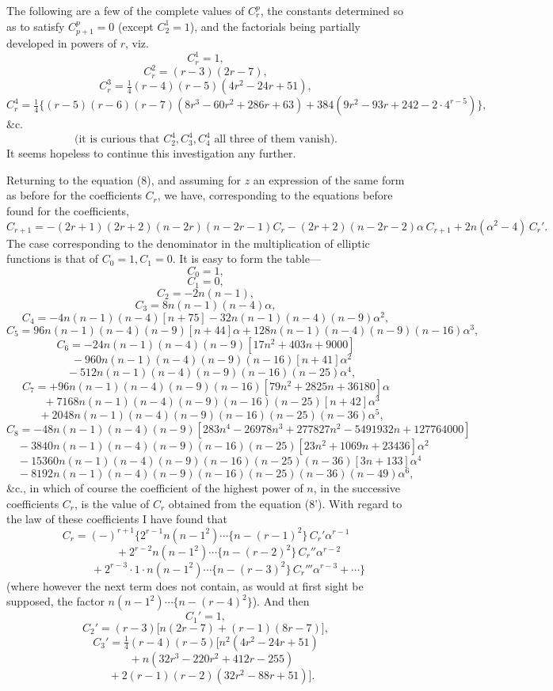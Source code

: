 \documentclass[12pt,a4paper]{article}
\begin{document}
The following are a few of the complete values of $C_r^p$, the constants determined so as to satisfy $C_{p+1}^p = 0$ (except $C_2^1 = 1$), and the factorials being partially developed in powers of $r$, viz.
\[
C_r^1 = 1,
\]
\[
C_r^2 = (r - 3)(2r - 7),
\]
\[
C_r^3 = \tfrac14(r - 4)(r - 5)(4r^2 - 24r + 51),
\]
\[
C_r^4 = \tfrac14\bigl\{(r - 5)(r - 6)(r - 7)(8r^3 - 60r^2 + 286r + 63) + 384(9r^2 - 93r + 242 - 2\cdot 4^{r-5})\bigr\},
\]
\&c.\
\[
\text{(it is curious that }C_2^4, C_3^4, C_4^4\text{ all three of them vanish).}
\]
It seems hopeless to continue this investigation any further.

Returning to the equation (8), and assuming for $z$ an expression of the same form as before for the coefficients $C_r$, we have, corresponding to the equations before found for the coefficients,
\[
C_{r+1} = -(2r + 1)(2r + 2)(n - 2r)(n - 2r - 1)C_r - (2r + 2)(n - 2r - 2)\alpha\,C_{r+1} + 2n(\alpha^2 - 4)\,C_r'.
\]
The case corresponding to the denominator in the multiplication of elliptic functions is that of $C_0 = 1, C_1 = 0$. It is easy to form the table---
\[
C_0 = 1,
\]
\[
C_1 = 0,
\]
\[
C_2 = -2n(n - 1),
\]
\[
C_3 = 8n(n - 1)(n - 4)\alpha,
\]
\[
C_4 = -4n(n - 1)(n - 4)[n + 75] - 32n(n - 1)(n - 4)(n - 9)\alpha^2,
\]
\[
C_5 = 96n(n - 1)(n - 4)(n - 9)[n + 44]\alpha + 128n(n - 1)(n - 4)(n - 9)(n - 16)\alpha^3,
\]
\[
C_6 = -24n(n - 1)(n - 4)(n - 9)[17n^2 + 403n + 9000]
\]
\[
\quad - 960n(n - 1)(n - 4)(n - 9)(n - 16)[n + 41]\alpha^2
\]
\[
\quad - 512n(n - 1)(n - 4)(n - 9)(n - 16)(n - 25)\alpha^4,
\]
\[
C_7 = +96n(n - 1)(n - 4)(n - 9)(n - 16)[79n^2 + 2825n + 36180]\alpha
\]
\[
\quad + 7168n(n - 1)(n - 4)(n - 9)(n - 16)(n - 25)[n + 42]\alpha^3
\]
\[
\quad + 2048n(n - 1)(n - 4)(n - 9)(n - 16)(n - 25)(n - 36)\alpha^5,
\]
\[
C_8 = -48n(n - 1)(n - 4)(n - 9)[283 n^4 - 26978 n^3 + 277827 n^2 - 5491932 n + 127764000]
\]
\[
\quad - 3840 n(n - 1)(n - 4)(n - 9)(n - 16)(n - 25)[23 n^2 + 1069 n + 23436]\alpha^2
\]
\[
\quad - 15360 n(n - 1)(n - 4)(n - 9)(n - 16)(n - 25)(n - 36)[3n + 133]\alpha^4
\]
\[
\quad - 8192 n(n - 1)(n - 4)(n - 9)(n - 16)(n - 25)(n - 36)(n - 49)\alpha^6,
\]
\&c.,
in which of course the coefficient of the highest power of $n$, in the successive coefficients $C_r$, is the value of $C_r$ obtained from the equation (8'). With regard to the law of these coefficients I have found that
\[
C_r = (-)^{r+1}\bigl\{2^{r-1} n(n - 1^2)\cdots\{n - (r - 1)^2\}\,C_r' \alpha^{r-1}
\]
\[
\qquad\qquad + 2^{r-2} n(n - 1^2)\cdots\{n - (r - 2)^2\}\,C_r'' \alpha^{r-2}
\]
\[
\qquad\qquad + 2^{r-3} \cdot 1 \cdot n(n - 1^2)\cdots\{n - (r - 3)^2\}\,C_r''' \alpha^{r-3}+\cdots\bigr\}
\]
(where however the next term does not contain, as would at first sight be supposed, the factor $n(n - 1^2)\cdots\{n - (r - 4)^2\}$). And then
\[
C_1' = 1,
\]
\[
C_2' = (r - 3)\bigl[n(2r - 7) + (r - 1)(8r - 7)\bigr],
\]
\[
C_3' = \tfrac14(r - 4)(r - 5)\bigl[n^2(4r^2 - 24r + 51)
\]
\[
\quad + n(32r^3 - 220r^2 + 412r - 255)
\]
\[
\quad + 2(r - 1)(r - 2)(32r^2 - 88r + 51)\bigr].
\]
\end{document}
